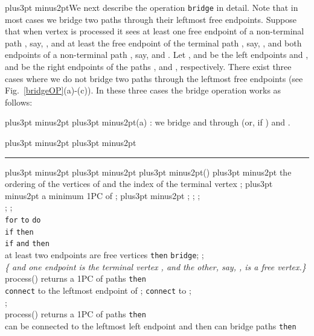 \documentclass[10pt]{article}
\def\yskip{\penalty-50\vskip3pt plus3pt minus2pt}
\def\y{\yskip}
\def\yy{\yskip\yskip}
\begin{document}
\y We next describe the operation {\tt bridge} in detail. Note
that in most cases we bridge two paths through their leftmost free
endpoints. Suppose that when vertex  is processed it sees at
least one free endpoint of a non-terminal path , say, ,
and at least the free endpoint of the terminal path , say,
, and both endpoints of a non-terminal path , say,
 and . Let ,  and  be the left endpoints
and ,  and  be the right endpoints of the paths
,  and , respectively. There exist three cases
where we do not bridge two paths through the leftmost free
endpoints (see Fig.~\ref{bridgeOP}(a)-(c)). In these three cases
the bridge operation works as follows:

\yy \noindent (a) : we bridge 
and  through  (or,  if ) and
.

\bigskip
\small{ \yy \hrule \y\y\y {}() \y
{} the ordering  of the vertices of 
and the index  of the terminal vertex ;\y {} a minimum 1PC  of ;
\y\noindent
  ;
  ; ;\\
  ; ; \\
{\tt for}  {\tt to}  {\tt do}\\
 {\tt if}  {\tt then}\\
\phantom{\tt el} {\tt if}  {\tt and}  {\tt then}\\
\phantom{\tt el}\phantom{\tt el}\phantom{\tt el}{\tt if} at
least two endpoints are free vertices {\tt then} {\tt bridge}; ;\\
 \phantom{\tt
el}\phantom{\tt el}\phantom{\tt el}{\tt else}\phantom{\tt else} {\it \{ and one endpoint is the terminal vertex , and the other, say, , is a free vertex.\}}\\
\phantom{\tt el}\phantom{\tt el}\phantom{\tt el}\phantom{\tt
el}{\tt if} process() returns a
1PC  of 
paths {\tt then}\\
\phantom{\tt el}\phantom{\tt el}\phantom{\tt el}\phantom{\tt
el}\phantom{\tt el} {\tt connect}  to the leftmost endpoint
of ; {\tt connect}  to ;\\
\phantom{\tt el}\phantom{\tt el}\phantom{\tt el}\phantom{\tt
el}\phantom{\tt el} ;\\
\phantom{\tt el}\phantom{\tt el}\phantom{\tt el}\phantom{\tt
el}{\tt else-if} process()
returns a 1PC  of 
paths {\tt then}\\
\phantom{\tt el}\phantom{\tt el}\phantom{\tt el}\phantom{\tt
el}\phantom{\tt el}{\tt if}  can be connected to the leftmost left endpoint and then  can bridge paths {\tt then}\\
}
\end{document}
